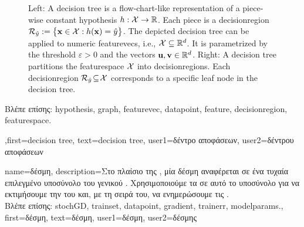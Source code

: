 {{\begin{figure}[H]
\begin{minipage}{.45\textwidth}
\end{minipage}
	\caption{Left: A decision tree is a flow-chart-like representation of a piece-wise constant \gls{hypothesis} $h: \mathcal{X} \rightarrow \mathbb{R}$.  Each piece is a \gls{decisionregion} $\mathcal{R}_{\hat{y}} := \big\{ {\bf x} \in  \mathcal{X}: h({\bf x}) = \hat{y} \big\}$. 
		The depicted decision tree can be applied to numeric \gls{featurevec}s, i.e., $\mathcal{X} \subseteq \mathbb{R}^{d}$. It is  parametrized by the threshold $\varepsilon>0$ and the vectors ${\bf u}, {\bf v} \in \mathbb{R}^{d}$. 
		Right: A decision tree partitions  
		the \gls{featurespace} $\mathcal{X}$ into \gls{decisionregion}s. Each \gls{decisionregion}  
		$\mathcal{R}_{\hat{y}} \!\subseteq\!\mathcal{X}$ corresponds to a specific leaf node in the decision tree.}
	\label{fig_decision_tree}
\end{figure} 
\foreignlanguage{greek}{Βλέπε επίσης:} \gls{hypothesis}, \gls{graph}, \gls{featurevec}, \gls{datapoint}, \gls{feature}, \gls{decisionregion}, \gls{featurespace}.
	  }
	  ,first={decision tree},
	  text={decision tree},
	  user1={\foreignlanguage{greek}{δέντρο αποφάσεων}}, %
	  user2={\foreignlanguage{greek}{δέντρου αποφάσεων}} %
}

{name={\foreignlanguage{greek}{δέσμη}},
	description={\foreignlanguage{greek}{Στο πλαίσιο της} , 
	\foreignlanguage{greek}{μία δέσμη αναφέρεται σε ένα τυχαία επιλεγμένο υποσύνολο 
	του γενικού} . \foreignlanguage{greek}{Χρησιμοποιούμε τα}  
	\foreignlanguage{greek}{σε αυτό το υποσύνολο για να εκτιμήσουμε την} 
	 \foreignlanguage{greek}{του}  \foreignlanguage{greek}{και, με τη σειρά του, 
	να ενημερώσουμε τις} .\\
	\foreignlanguage{greek}{Βλέπε επίσης:} \gls{stochGD}, \gls{trainset}, \gls{datapoint}, \gls{gradient}, \gls{trainerr}, \gls{modelparams}.}, 
	first={\foreignlanguage{greek}{δέσμη}},
	text={\foreignlanguage{greek}{δέσμη}},
	user1={\foreignlanguage{greek}{δέσμη}}, %
    	user2={\foreignlanguage{greek}{δέσμης}} %
}

